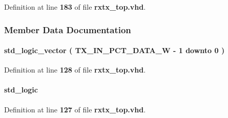 Definition at line {\bf 183} of file {\bf rxtx\+\_\+top.\+vhd}.



\subsubsection{Member Data Documentation}
\paragraph[{inst0\+\_\+fifo\+\_\+data}]{ {\bfseries \textcolor{comment}{std\+\_\+logic\+\_\+vector}\textcolor{vhdlchar}{ }\textcolor{vhdlchar}{(}\textcolor{vhdlchar}{ }\textcolor{vhdlchar}{ }\textcolor{vhdlchar}{ }\textcolor{vhdlchar}{ }{\bfseries {\bf T\+X\+\_\+\+I\+N\+\_\+\+P\+C\+T\+\_\+\+D\+A\+T\+A\+\_\+W}} \textcolor{vhdlchar}{-\/}\textcolor{vhdlchar}{ } \textcolor{vhdldigit}{1} \textcolor{vhdlchar}{ }\textcolor{keywordflow}{downto}\textcolor{vhdlchar}{ }\textcolor{vhdlchar}{ } \textcolor{vhdldigit}{0} \textcolor{vhdlchar}{ }\textcolor{vhdlchar}{)}\textcolor{vhdlchar}{ }} \hspace{0.3cm}{\ttfamily [Signal]}}\label{classrxtx__top_1_1arch_a2fa4ea56461737d542a7ccfc2e13e6d2}


Definition at line {\bf 128} of file {\bf rxtx\+\_\+top.\+vhd}.

\paragraph[{inst0\+\_\+fifo\+\_\+wrreq}]{ {\bfseries \textcolor{comment}{std\+\_\+logic}\textcolor{vhdlchar}{ }} \hspace{0.3cm}{\ttfamily [Signal]}}\label{classrxtx__top_1_1arch_a838f6eec202423e2c44778f9b58d48ac}


Definition at line {\bf 127} of file {\bf rxtx\+\_\+top.\+vhd}.

